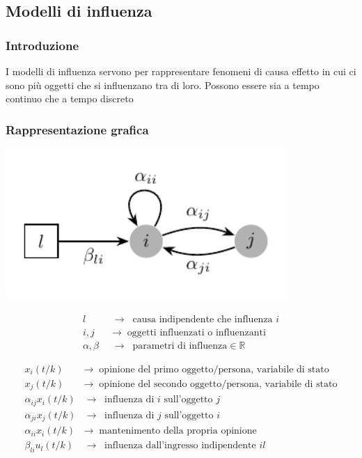 \newpage

\subsection{Modelli di influenza}
\subsubsection*{Introduzione}
I modelli di influenza servono per rappresentare fenomeni di causa effetto in cui ci sono più oggetti che si influenzano tra di
loro. Possono essere sia a tempo continuo che a tempo discreto

\subsubsection*{Rappresentazione grafica}
\begin{center}
	\begin{minipage}{0.4\textwidth}
		\centering
		\includegraphics[width=0.8\textwidth]{modelli/modello influenza.pdf}
	\end{minipage}
	\begin{minipage}{0.5\textwidth}
		\begin{align*}
			l \;\; &\rightarrow \;\; \text{causa indipendente che influenza } i \\
			i,j  \;\; &\rightarrow \;\; \text{oggetti influenzati o influenzanti} \\
			\alpha, \beta\;\; &\rightarrow \;\; \text{parametri di influenza} \in \mathbb{R} 
		\end{align*}
	\end{minipage}
	\begin{align*}
		x_i(t/k) &\rightarrow \;\; \text{opinione del primo oggetto/persona, variabile di stato} \\
		x_j(t/k) &\rightarrow \;\; \text{opinione del secondo oggetto/persona, variabile di stato} \\
		\alpha_{ij} x_i(t/k) &\rightarrow \;\; \text{influenza di } i \text{ sull'oggetto } j \\
		\alpha_{ji} x_j(t/k) &\rightarrow \;\; \text{influenza di } j \text{ sull'oggetto } i \\
		\alpha_{ii} x_i(t/k) &\rightarrow \;\; \text{mantenimento della propria opinione} \\
		\beta_{li} u_l(t/k) &\rightarrow \;\; \text{influenza dall'ingresso indipendente } il \\
	\end{align*}
\end{center}

